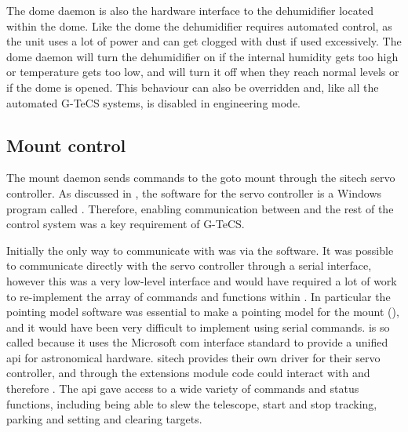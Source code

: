 \begin{colsection}
\begin{colsection}
The dome daemon is also the hardware interface to the dehumidifier located within the dome. Like the dome the dehumidifier requires automated control, as the unit uses a lot of power and can get clogged with dust if used excessively. The dome daemon will turn the dehumidifier on if the internal humidity gets too high or temperature gets too low, and will turn it off when they reach normal levels or if the dome is opened. This behaviour can also be overridden and, like all the automated G-TeCS systems, is disabled in engineering mode.

\end{colsection}


\subsection{Mount control}
\label{sec:mount}
\begin{colsection}

The mount daemon sends commands to the \gls{goto} mount through the \gls{sitech} servo controller. As discussed in , the software for the servo controller is a Windows program called . Therefore, enabling communication between  and the rest of the control system was a key requirement of G-TeCS.\@

Initially the only way to communicate with  was via the  software. It was possible to communicate directly with the servo controller through a serial interface, however this was a very low-level interface and would have required a lot of work to re-implement the array of commands and functions within . In particular the  pointing model software was essential to make a pointing model for the mount (), and it would have been very difficult to implement using serial commands.  is so called because it uses the Microsoft \gls{com} interface standard to provide a unified \gls{api} for astronomical hardware. \gls{sitech} provides their own  driver for their servo controller, and through the   extensions module  code could interact with  and therefore . The  \gls{api} gave access to a wide variety of commands and status functions, including being able to slew the telescope, start and stop tracking, parking and setting and clearing targets.


\end{colsection}
\end{colsection}
